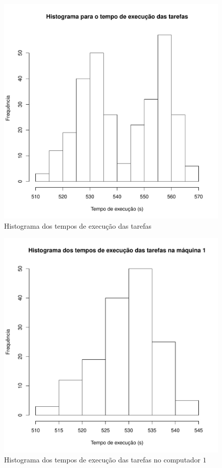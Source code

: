 \begin{figure}[!ht]
	\includegraphics[scale=0.8]{hist_geral.pdf}

	\caption{Histograma dos tempos de execução das tarefas}
	\label{hist_tarefas}
\end{figure}


\begin{figure}[!ht]
	\includegraphics[scale=0.8]{hist1.pdf}

	\caption{Histograma dos tempos de execução das tarefas no computador $1$}
	\label{hist_comp1}
\end{figure}


